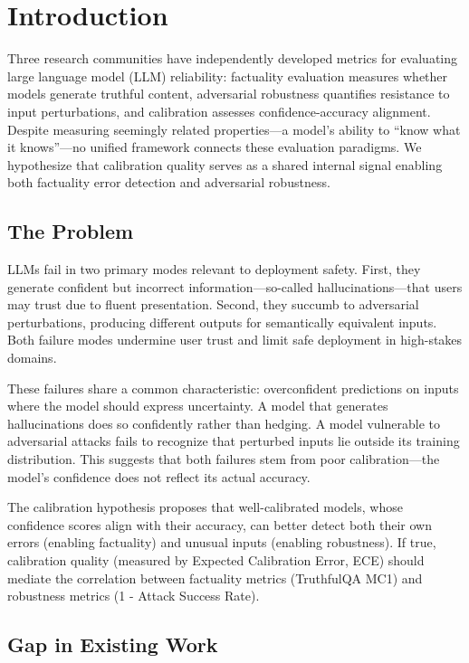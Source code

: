 \section{Introduction}

Three research communities have independently developed metrics for evaluating large language model (LLM) reliability: factuality evaluation measures whether models generate truthful content, adversarial robustness quantifies resistance to input perturbations, and calibration assesses confidence-accuracy alignment. Despite measuring seemingly related properties---a model's ability to ``know what it knows''---no unified framework connects these evaluation paradigms. We hypothesize that calibration quality serves as a shared internal signal enabling both factuality error detection and adversarial robustness.

\subsection{The Problem}

LLMs fail in two primary modes relevant to deployment safety. First, they generate confident but incorrect information---so-called hallucinations---that users may trust due to fluent presentation. Second, they succumb to adversarial perturbations, producing different outputs for semantically equivalent inputs. Both failure modes undermine user trust and limit safe deployment in high-stakes domains.

These failures share a common characteristic: overconfident predictions on inputs where the model should express uncertainty. A model that generates hallucinations does so confidently rather than hedging. A model vulnerable to adversarial attacks fails to recognize that perturbed inputs lie outside its training distribution. This suggests that both failures stem from poor calibration---the model's confidence does not reflect its actual accuracy.

The calibration hypothesis proposes that well-calibrated models, whose confidence scores align with their accuracy, can better detect both their own errors (enabling factuality) and unusual inputs (enabling robustness). If true, calibration quality (measured by Expected Calibration Error, ECE) should mediate the correlation between factuality metrics (TruthfulQA MC1) and robustness metrics (1 - Attack Success Rate).

\subsection{Gap in Existing Work}

